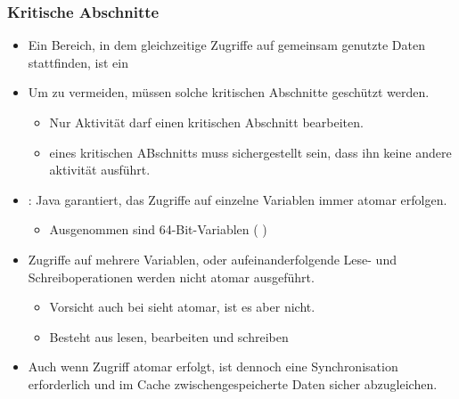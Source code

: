 \subsubsection{Kritische Abschnitte}
\begin{itemize}
    \item Ein Bereich, in dem gleichzeitige Zugriffe auf gemeinsam genutzte Daten stattfinden, ist ein 
    \item Um  zu vermeiden, müssen solche kritischen Abschnitte geschützt werden.
    \begin{itemize}
        \item Nur  Aktivität darf einen kritischen Abschnitt  bearbeiten.
        \item {} eines kritischen ABschnitts muss sichergestellt sein, dass ihn keine andere aktivität ausführt.
    \end{itemize}
    \item {}: Java garantiert, das Zugriffe auf einzelne Variablen immer atomar erfolgen.
    \begin{itemize}
        \item Ausgenommen sind 64-Bit-Variablen ( )
    \end{itemize}
    \item Zugriffe auf mehrere Variablen, oder aufeinanderfolgende Lese- und Schreiboperationen werden nicht atomar ausgeführt.
    \begin{itemize}
        \item Vorsicht auch bei  sieht atomar, ist es aber nicht.
        \item Besteht aus lesen, bearbeiten und schreiben
    \end{itemize}
    \item Auch wenn Zugriff atomar erfolgt, ist dennoch eine Synchronisation erforderlich und im Cache zwischengespeicherte Daten sicher abzugleichen.
\end{itemize}


